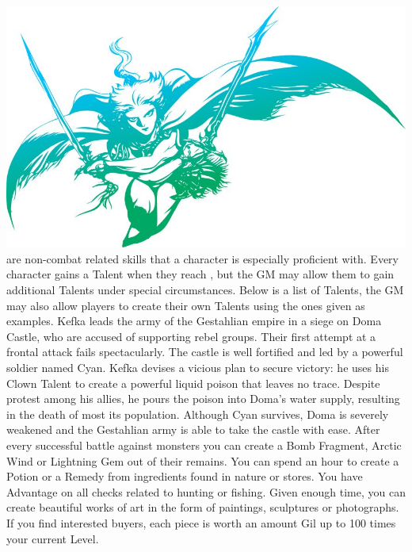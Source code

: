 %
\\
%
\includegraphics[width=\columnwidth]{./art/images/ff3.jpg}
%
\vfill
%
 are non-combat related skills that a character is especially proficient with.
Every character gains a Talent when they reach , but the GM may allow them to gain additional Talents under special circumstances.
Below is a list of Talents, the GM may also allow players to create their own Talents using the ones given as examples.
%
\ofpar
%
{
	Kefka leads the army of the Gestahlian empire in a siege on Doma Castle, who are accused of supporting rebel groups.
	Their first attempt at a frontal attack fails spectacularly.
	The castle is well fortified and led by a powerful soldier named Cyan.
	Kefka devises a vicious plan to secure victory: 
	he uses his Clown Talent to create a powerful liquid poison that leaves no trace.
	Despite protest among his allies, he pours the poison into Doma's water supply, resulting in the death of most its population.
	Although Cyan survives, Doma is severely weakened and the Gestahlian army is able to take the castle with ease.
}	
%	
\ofpar\vfill
%
{
	After every successful battle against monsters you can create a Bomb Fragment, Arctic Wind or Lightning Gem out of their remains. 
}
\vfill
{}
{
	You can spend an hour to create a Potion or a Remedy from ingredients found in nature or stores.
}
\vfill
{}
{
	You have Advantage on all checks related to hunting or fishing.
}
\vfill
{}
{
	Given enough time, you can create beautiful works of art in the form of paintings, sculptures or photographs.
	If you find interested buyers, each piece is worth an amount Gil up to 100 times your current Level.
}
